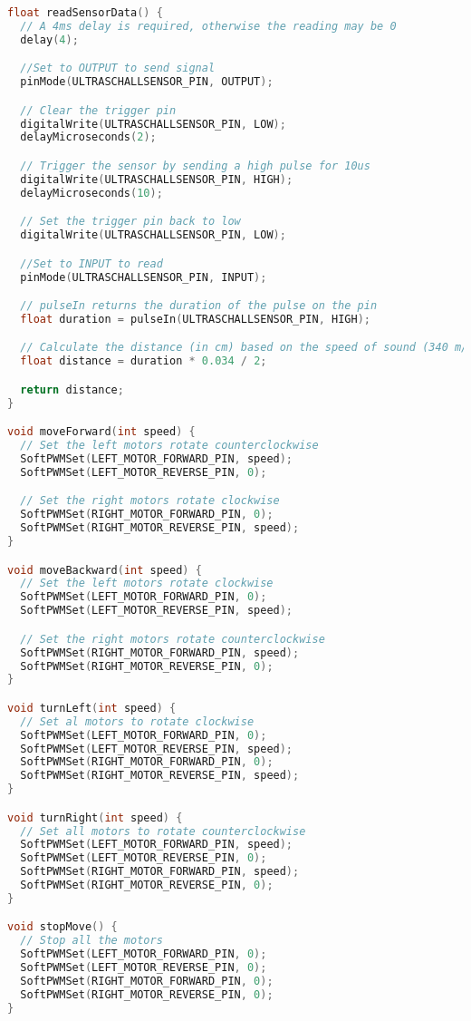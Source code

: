 \documentclass{vorlage-design-main}
\begin{document}
\begin{lstlisting}[language={C++}]
float readSensorData() {
  // A 4ms delay is required, otherwise the reading may be 0
  delay(4);

  //Set to OUTPUT to send signal
  pinMode(ULTRASCHALLSENSOR_PIN, OUTPUT);

  // Clear the trigger pin
  digitalWrite(ULTRASCHALLSENSOR_PIN, LOW);
  delayMicroseconds(2);

  // Trigger the sensor by sending a high pulse for 10us
  digitalWrite(ULTRASCHALLSENSOR_PIN, HIGH);
  delayMicroseconds(10);

  // Set the trigger pin back to low
  digitalWrite(ULTRASCHALLSENSOR_PIN, LOW);

  //Set to INPUT to read
  pinMode(ULTRASCHALLSENSOR_PIN, INPUT);

  // pulseIn returns the duration of the pulse on the pin
  float duration = pulseIn(ULTRASCHALLSENSOR_PIN, HIGH);

  // Calculate the distance (in cm) based on the speed of sound (340 m/s or 0.034 cm/us)
  float distance = duration * 0.034 / 2;

  return distance;
}

void moveForward(int speed) {
  // Set the left motors rotate counterclockwise
  SoftPWMSet(LEFT_MOTOR_FORWARD_PIN, speed);
  SoftPWMSet(LEFT_MOTOR_REVERSE_PIN, 0);

  // Set the right motors rotate clockwise
  SoftPWMSet(RIGHT_MOTOR_FORWARD_PIN, 0);
  SoftPWMSet(RIGHT_MOTOR_REVERSE_PIN, speed);
}

void moveBackward(int speed) {
  // Set the left motors rotate clockwise
  SoftPWMSet(LEFT_MOTOR_FORWARD_PIN, 0);
  SoftPWMSet(LEFT_MOTOR_REVERSE_PIN, speed);

  // Set the right motors rotate counterclockwise
  SoftPWMSet(RIGHT_MOTOR_FORWARD_PIN, speed);
  SoftPWMSet(RIGHT_MOTOR_REVERSE_PIN, 0);
}

void turnLeft(int speed) {
  // Set al motors to rotate clockwise
  SoftPWMSet(LEFT_MOTOR_FORWARD_PIN, 0);
  SoftPWMSet(LEFT_MOTOR_REVERSE_PIN, speed);
  SoftPWMSet(RIGHT_MOTOR_FORWARD_PIN, 0);
  SoftPWMSet(RIGHT_MOTOR_REVERSE_PIN, speed);
}

void turnRight(int speed) {
  // Set all motors to rotate counterclockwise
  SoftPWMSet(LEFT_MOTOR_FORWARD_PIN, speed);
  SoftPWMSet(LEFT_MOTOR_REVERSE_PIN, 0);
  SoftPWMSet(RIGHT_MOTOR_FORWARD_PIN, speed);
  SoftPWMSet(RIGHT_MOTOR_REVERSE_PIN, 0);
}

void stopMove() {
  // Stop all the motors
  SoftPWMSet(LEFT_MOTOR_FORWARD_PIN, 0);
  SoftPWMSet(LEFT_MOTOR_REVERSE_PIN, 0);
  SoftPWMSet(RIGHT_MOTOR_FORWARD_PIN, 0);
  SoftPWMSet(RIGHT_MOTOR_REVERSE_PIN, 0);
}
\end{lstlisting}
\end{document}

